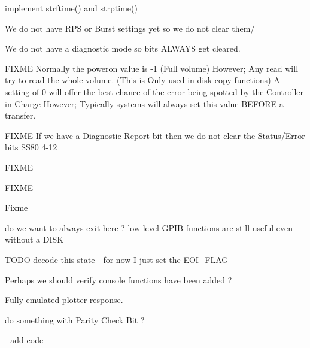 
\begin{DoxyRefList}
\item[\label{todo__todo000001}%
\hypertarget{todo__todo000001}{}%
Global \hyperlink{time_8h_a7ffc52def0c7fbf70c50248e3f7d6a8a}{asctime\+\_\+r} (tm\+\_\+t $\ast$t, char $\ast$buf)]implement strftime() and strptime()  
\item[\label{todo__todo000042}%
\hypertarget{todo__todo000042}{}%
Global \hyperlink{ss80_8h_aa48ccb1479e226dacfaa1dac15631a9d}{Clear\+\_\+\+Common} (int u)]We do not have R\+PS or Burst settings yet so we do not clear them/ 

We do not have a diagnostic mode so bits A\+L\+W\+A\+YS get cleared. 

F\+I\+X\+ME Normally the poweron value is -\/1 (Full volume) However; Any read will try to read the whole volume. (This is Only used in disk copy functions) A setting of 0 will offer the best chance of the error being spotted by the Controller in Charge However; Typically systems will always set this value B\+E\+F\+O\+RE a transfer. 

F\+I\+X\+ME If we have a Diagnostic Report bit then we do not clear the Status/\+Error bits S\+S80 4-\/12  
\item[\label{todo__todo000004}%
\hypertarget{todo__todo000004}{}%
Global \hyperlink{gpib__task_8h_ac63d4e431ab55dddfbf436d87135128e}{G\+P\+IB} (uint8\+\_\+t ch)]F\+I\+X\+ME 

F\+I\+X\+ME 

Fixme  
\item[\label{todo__todo000003}%
\hypertarget{todo__todo000003}{}%
Global \hyperlink{gpib__task_8h_a903eb44d83bf8f2db71e6f32a35fec62}{gpib\+\_\+error\+\_\+test} (uint16\+\_\+t val)]do we want to always exit here ? low level G\+P\+IB functions are still useful even without a D\+I\+SK  
\item[\label{todo__todo000002}%
\hypertarget{todo__todo000002}{}%
Global \hyperlink{gpib_8h_a67f7cdca85091b3eb0eea0051a200fbe}{gpib\+\_\+read\+\_\+str} (uint8\+\_\+t $\ast$buf, int size, uint16\+\_\+t $\ast$status)]T\+O\+DO decode this state -\/ for now I just set the E\+O\+I\+\_\+\+F\+L\+AG  
\item[\label{todo__todo000049}%
\hypertarget{todo__todo000049}{}%
Global \hyperlink{posix_8h_a31986cce890109c211ccb14151aafd0e}{isatty} (int fileno)]Perhaps we should verify console functions have been added ?  
\item[\label{todo__todo000007}%
\hypertarget{todo__todo000007}{}%
Global \hyperlink{printer_8h_a72686fe9d4969430b6ef1f1fe68a6efe}{P\+R\+I\+N\+T\+E\+R\+\_\+\+C\+O\+M\+M\+A\+N\+DS} (uint8\+\_\+t ch)]Fully emulated plotter response.  
\item[\label{todo__todo000046}%
\hypertarget{todo__todo000046}{}%
Global \hyperlink{ss80_8h_a9efbe3d75e86d4003a9fbf1c8cd69919}{S\+S80\+\_\+\+Amigo\+\_\+\+Clear} (void)]do something with Parity Check Bit ?  
\item[\label{todo__todo000047}%
\hypertarget{todo__todo000047}{}%
Global \hyperlink{ss80_8h_ab54868f20762a1bb3e57f65fd191e937}{S\+S80\+\_\+\+Cancel} (void)]-\/ add code 


\end{DoxyRefList}
